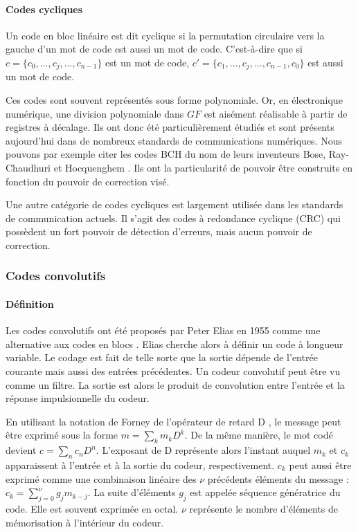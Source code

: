 \paragraph*{Codes cycliques} Un code en bloc linéaire est dit cyclique si la permutation circulaire vers la 
gauche d'un mot de code est aussi un mot de code. C'est-à-dire que si $c = \{c_0, ..., c_j, ..., c_{n-1}\}$ est un mot 
de code, $c' = \{c_1, ..., c_j, ..., c_{n-1}, c_0\}$ est aussi un mot de code.

Ces codes sont souvent représentés sous forme polynomiale. Or, en électronique numérique, une division polynomiale dans $GF$ est aisément 
réalisable à partir de registres à décalage. Ils ont donc été particulièrement étudiés et sont présents aujourd'hui dans 
de nombreux standards de communications numériques. Nous pouvons par exemple citer les codes BCH du nom de leurs inventeurs Bose, 
Ray-Chaudhuri et Hocquenghem \cite{bose1960class}. Ils ont la particularité de pouvoir être construits en fonction du pouvoir 
de correction visé.

Une autre catégorie de codes cycliques est largement utilisée dans les standards de communication actuels. Il s'agit des 
codes à redondance cyclique (CRC) \cite{crc} qui possèdent un fort pouvoir de détection d'erreurs, mais aucun pouvoir de correction. 

\subsubsection{Codes convolutifs}
\paragraph*{Définition}
Les codes convolutifs ont été proposés par Peter Elias en 1955 comme une alternative aux codes en blocs \cite{elias}. 
Elias cherche alors à définir un code à longueur variable. Le codage est fait de telle sorte que la sortie dépende de 
l'entrée courante mais aussi des entrées précédentes. Un codeur convolutif peut être vu comme un filtre. La sortie 
est alors le produit de convolution entre l'entrée et la réponse impulsionnelle du codeur. 

En utilisant la notation de Forney de l'opérateur de retard D \cite{forney1970convolutional}, le message peut être exprimé 
sous la forme $m=\sum_k m_kD^k$. De la même manière, le mot codé devient $c=\sum_n c_nD^n$. L'exposant de D représente 
alors l'instant auquel $m_k$ et $c_k$ apparaissent à l'entrée et à la sortie du codeur, respectivement. $c_k$ peut aussi 
être exprimé comme une combinaison linéaire des $\nu$ précédents éléments du message : $c_k = \sum\limits_{j=0}^\nu g_jm_{k-j}$.
La suite d'éléments $g_j$ est appelée séquence génératrice du code. Elle est souvent exprimée en octal. $\nu$ représente le 
nombre d'éléments de mémorisation à l'intérieur du codeur.\vspace*{-1em}

